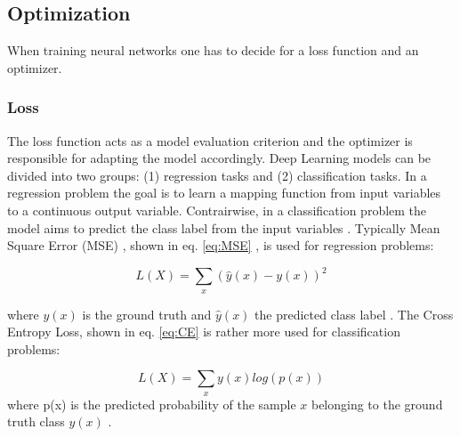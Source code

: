 \subsection{Optimization}
When training neural networks one has to decide for a loss function and an optimizer. 

\subsubsection{Loss}
The loss function acts as a model evaluation criterion and the optimizer is responsible for adapting the model accordingly. Deep Learning models can be divided into two groups: (1) regression tasks and (2) classification tasks. In a regression problem the goal is to learn a mapping function from input variables to a continuous output variable. Contrairwise, in a classification problem the model aims to predict the class label from the input variables \cite{ShilohPerl2020}. Typically Mean Square Error (MSE) , shown in eq. \ref{eq:MSE} , is used for regression problems:

\begin{equation}
L(X) =  \sum_{x}(\hat{y}(x)-y(x))^2
\label{eq:MSE}
\end{equation}

where $y(x)$ is the ground truth and $\hat{y}(x)$ the predicted class label \cite{ShilohPerl2020}. The Cross Entropy Loss, shown in eq. \ref{eq:CE} is rather more used for classification problems: 

\begin{equation}
L(X) = \sum_{x} y(x) log(p(x))
\label{eq:CE}
\end{equation}
where p(x) is the predicted probability of the sample $x$ belonging to the ground truth class $y(x)$ \cite{ShilohPerl2020}.

